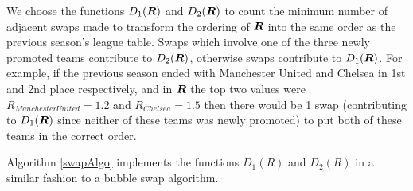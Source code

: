 We choose the functions \(D_1(\boldsymbol{R})\) and \(D_2(\boldsymbol{R})\) to count the minimum number of adjacent swaps made
to transform the ordering of \(\boldsymbol{R}\) into the same order as the previous season's league table. Swaps which
involve one of the three newly promoted teams contribute to \(D_2(\boldsymbol{R})\), otherwise swaps contribute to
\(D_1(\boldsymbol{R})\). For example, if the previous season ended with Manchester United and Chelsea in 1st and 2nd place
respectively, and in \(\boldsymbol{R}\) the top two values were \(R_{Manchester United} = 1.2\) and \(R_{Chelsea} = 1.5\)
then there would be 1 swap (contributing to \(D_1(\boldsymbol{R})\) since neither of these teams was newly promoted) to
put both of these teams in the correct order.

Algorithm \ref{swapAlgo} implements the functions \(D_1(R)\) and \(D_2(R)\) in a similar fashion to a bubble swap
algorithm.
